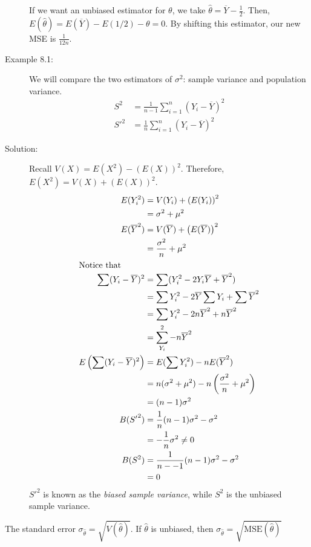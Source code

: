 \documentclass[10pt]{extarticle}
\begin{document}
\begin{description}
      If we want an unbiased estimator for $\theta$, we take $\hat{\theta} = \overline{Y} - \frac{1}{2}$. Then,
      $E(\hat{\theta}) = E(\overline{Y}) - E(1/2) - \theta = 0$. By shifting this estimator, our new MSE is $\frac{1}{12n}$.
    \item[Example 8.1:] We will compare the two estimators of $\sigma^2$: sample variance and population variance.
      \begin{align*}
        S^2 &= \frac{1}{n-1}\sum_{i=1}^{n}(Y_i-\overline{Y})^2\\
        {S'}^2 &= \frac{1}{n}\sum_{i=1}^{n}(Y_i - \overline{Y})^2
      \end{align*}
    \item[Solution:] Recall $V(X) = E(X^2) - (E(X))^2$. Therefore, $E(X^2) = V(X) + (E(X))^2$.
      \begin{align*}
        E(Y_i^2) &= V(Y_i) + \left(E(Y_i)\right)^2\\
                 &= \sigma^2 + \mu^2\\
        E(\overline{Y}^2) &= V(\overline{Y}) + \left(E(\overline{Y})\right)^2\\
                          &= \frac{\sigma^2}{n} + \mu^2\\
                          \shortintertext{Notice that}
        \sum (Y_i-\overline{Y})^2 &= \sum(Y_i^2 - 2Y_i\overline{Y} + \overline{Y}^2)\\
                                  &= \sum Y_i^2 - 2\overline{Y}\sum Y_i + \sum \overline{Y}^2\\
                                  &= \sum Y_i^2 -2n\overline{Y}^2+ n\overline{Y}^2\\
                                  &= \sum_{Y_i}^2 - n\overline{Y}^2\\
        E\left(\sum (Y_i-\overline{Y})^2\right) &= E(\sum Y_i^2) - nE(\overline{Y}^2)\\
                                                &= n(\sigma^2 + \mu^2) - n\left(\frac{\sigma^2}{n} + \mu^2\right)\\
                                                &= (n-1)\sigma^2\\
        B({S'}^2) &= \frac{1}{n}(n-1)\sigma^2 - \sigma^2\\
                  &= -\frac{1}{n}\sigma^2 \neq 0\\
        B(S^2) &= \frac{1}{n--1}(n-1)\sigma^2 - \sigma^2\\
               &= 0
      \end{align*}
      ${S'}^{2}$ is known as the \textit{biased sample variance}, while $S^2$ is the unbiased sample variance.
  \end{description}
  The standard error $\sigma_{\hat{\theta}} = \sqrt{V(\hat{\theta})}$. If $\hat{\theta}$ is unbiased, then $\sigma_{\hat{\theta}} = \sqrt{\text{MSE}(\hat\theta)}$
\end{document}
